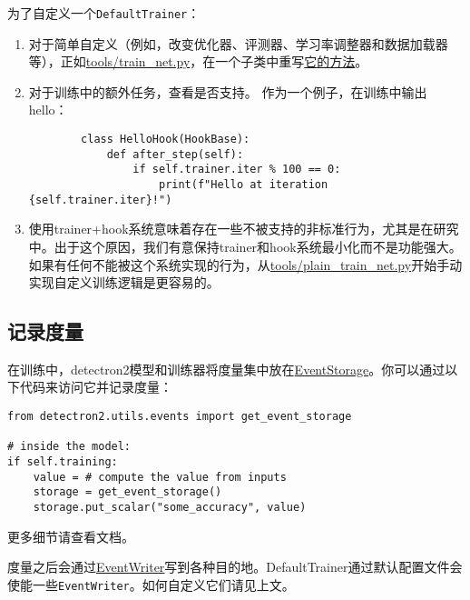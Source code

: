 \documentclass[../main.tex]{subfile}
\begin{document}
为了自定义一个\lstinline{DefaultTrainer}：
\begin{enumerate}
    \item 对于简单自定义（例如，改变优化器、评测器、学习率调整器和数据加载器等），正如\href{https://github.com/facebookresearch/detectron2/blob/master/tools/train_net.py}{tools/train\_net.py}，在一个子类中重写\href{https://detectron2.readthedocs.io/en/latest/modules/engine.html#detectron2.engine.defaults.DefaultTrainer}{它的方法}。
    \item 对于训练中的额外任务，查看\href{}{}是否支持。
          作为一个例子，在训练中输出hello：
          \begin{lstlisting}
        class HelloHook(HookBase):
            def after_step(self):
                if self.trainer.iter % 100 == 0:
                    print(f"Hello at iteration {self.trainer.iter}!")
    \end{lstlisting}
    \item 使用trainer+hook系统意味着存在一些不被支持的非标准行为，尤其是在研究中。出于这个原因，我们有意保持trainer和hook系统最小化而不是功能强大。如果有任何不能被这个系统实现的行为，从\href{https://github.com/facebookresearch/detectron2/blob/master/tools/plain_train_net.py}{tools/plain\_train\_net.py}开始手动实现自定义训练逻辑是更容易的。
\end{enumerate}

\subsection{记录度量}

在训练中，detectron2模型和训练器将度量集中放在\href{https://detectron2.readthedocs.io/en/latest/modules/utils.html#detectron2.utils.events.EventStorage}{EventStorage}。你可以通过以下代码来访问它并记录度量：
\begin{lstlisting}
from detectron2.utils.events import get_event_storage

# inside the model:
if self.training:
    value = # compute the value from inputs
    storage = get_event_storage()
    storage.put_scalar("some_accuracy", value)
\end{lstlisting}
更多细节请查看文档。

度量之后会通过\href{https://detectron2.readthedocs.io/en/latest/modules/utils.html#module-detectron2.utils.events}{EventWriter}写到各种目的地。DefaultTrainer通过默认配置文件会使能一些\lstinline{EventWriter}。如何自定义它们请见上文。
\end{document}
